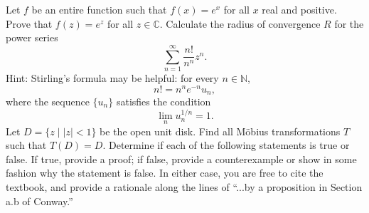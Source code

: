 \documentclass{exam}
\begin{document}
\begin{questions}
    \question[8]
        Let $f$ be an entire function such that $f(x) = e^x$ for all $x$ real and positive. Prove that $f(z) = e^z$ for all $z\in\mathbb{C}$.
    \question[10]
        Calculate the radius of convergence $R$ for the power series
        \[\sum_{n=1}^\infty \frac{n!}{n^n}z^n.\]
        Hint: Stirling's formula may be helpful: for every $n\in\mathbb{N}$, 
        \[n! = n^ne^{-n}u_n,\]
        where the sequence $\{u_n\}$ satisfies the condition
        \[\lim_n u_n^{1/n} = 1.\]
    \question[10]
        Let $D = \{z \mid |z| < 1\}$ be the open unit disk. Find all Möbius transformations $T$ such that $T(D)=D$.
    \question[12]
        Determine if each of the following statements is true or false. If true, provide a proof; if false, 
        provide a counterexample or show in some fashion why the statement is false. In either case, you are free 
        to cite the textbook, and provide a rationale along the lines of ``...by a proposition in Section a.b of Conway.''
\end{questions}
\end{document}
